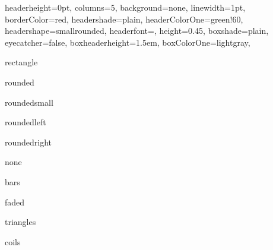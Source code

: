 \documentclass[portrait,fontscale=1,margin=0.2cm,paperwidth=15truecm, paperheight=3.5cm,debug]{baposter}
\begin{document}
\begin{poster}{
  headerheight=0pt,
  columns=5,
  background=none,
  linewidth=1pt,
  borderColor=red,
  headershade=plain,
  headerColorOne=green!60,
  headershape=smallrounded,
  headerfont={},
  height=0.45,
  boxshade=plain,
  eyecatcher=false,
  boxheaderheight=1.5em,
  boxColorOne=lightgray,
}{}{}{}{}

\begin{posterbox}[column=0,textborder=rectangle]{}
rectangle
\end{posterbox}

\begin{posterbox}[column=1,textborder=rounded]{}
rounded
\end{posterbox}

\begin{posterbox}[column=2,textborder=roundedsmall]{}
roundedsmall
\end{posterbox}

\begin{posterbox}[column=3,textborder=roundedleft]{}
roundedleft
\end{posterbox}

\begin{posterbox}[column=4,textborder=roundedright]{}
roundedright
\end{posterbox}




\begin{posterbox}[column=0,row=0.55,textborder=none]{}
none
\end{posterbox}

\begin{posterbox}[column=1,row=0.55,textborder=bars]{}
bars
\end{posterbox}

\begin{posterbox}[column=2,row=0.55,textborder=faded]{}
faded
\end{posterbox}

\begin{posterbox}[column=3,row=0.55,textborder=triangles]{}
triangles
\end{posterbox}

\begin{posterbox}[column=4,row=0.55,linewidth=0.5pt,textborder=coils]{}
coils
\end{posterbox}

\end{poster}
\end{document}
